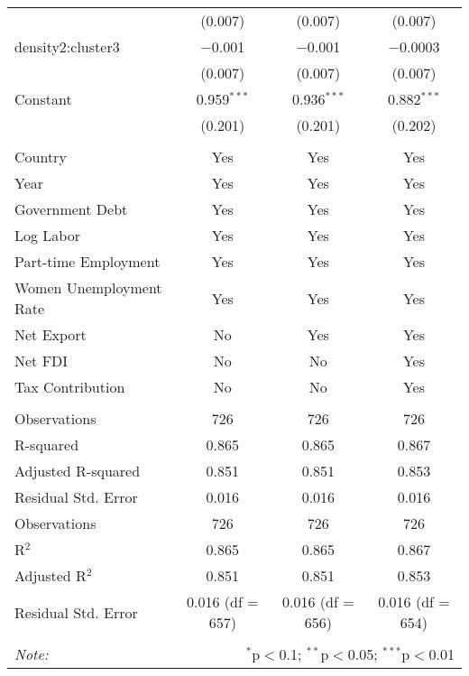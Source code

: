 \begin{table}[!htbp]
\begin{tabular}{@{\extracolsep{5pt}}lccc}
  & (0.007) & (0.007) & (0.007) \\ 
  density2:cluster3 & $-$0.001 & $-$0.001 & $-$0.0003 \\ 
  & (0.007) & (0.007) & (0.007) \\ 
  Constant & 0.959$^{***}$ & 0.936$^{***}$ & 0.882$^{***}$ \\ 
  & (0.201) & (0.201) & (0.202) \\ 
 \hline \\[-1.8ex] 
Country & Yes & Yes & Yes \\ 
Year & Yes & Yes & Yes \\ 
Government Debt & Yes & Yes & Yes \\ 
Log Labor & Yes & Yes & Yes \\ 
Part-time Employment & Yes & Yes & Yes \\ 
Women Unemployment Rate & Yes & Yes & Yes \\ 
Net Export & No & Yes & Yes \\ 
Net FDI & No & No & Yes \\ 
Tax Contribution & No & No & Yes \\ 
\hline \\[-1.8ex] 
Observations & 726 & 726 & 726 \\ 
R-squared & 0.865 & 0.865 & 0.867 \\ 
Adjusted R-squared & 0.851 & 0.851 & 0.853 \\ 
Residual Std. Error & 0.016 & 0.016 & 0.016 \\ 
Observations & 726 & 726 & 726 \\ 
R$^{2}$ & 0.865 & 0.865 & 0.867 \\ 
Adjusted R$^{2}$ & 0.851 & 0.851 & 0.853 \\ 
Residual Std. Error & 0.016 (df = 657) & 0.016 (df = 656) & 0.016 (df = 654) \\ 
\hline 
\hline \\[-1.8ex] 
\textit{Note:}  & \multicolumn{3}{r}{$^{*}$p$<$0.1; $^{**}$p$<$0.05; $^{***}$p$<$0.01} \\ 
\end{tabular} 
\end{table} 
